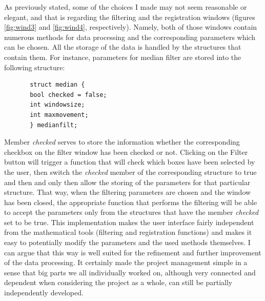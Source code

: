 \documentclass[aps,letterpaper,11pt]{revtex4}
\begin{document}
As previously stated, some of the choices I made may not seem reasonable or elegant, and that is regarding the filtering and the registration windows (figures \ref{fig:wind3} and \ref {fig:wind4}, respectively). Namely, both of those windows contain numerous methods for data processing and the corresponding parameters which can be chosen. All the storage of the data is handled by the structures that contain them. For instance, parameters for median filter  are stored into the following structure:\par
\begin{lstlisting}
       struct median {
       bool checked = false;
       int windowsize;
       int maxmovement;
   	   } medianfilt;
\end{lstlisting}\par
Member \textit{checked} serves to store the information whether the corresponding checkbox on the filter window has been checked or not. Clicking on the Filter button will trigger a function that will check which boxes have been selected by the user, then switch the \textit{checked} member of the corresponding structure to true and then and only then allow the storing of the parameters for that particular structure. That way, when the filtering parameters are chosen and the window has been closed, the appropriate function that performs the filtering will be able to accept the parameters only from the structures that have the member \textit{checked} set to be true. This implementation makes the user interface fairly independent from the mathematical tools (filtering and registration functions) and makes it easy to potentially modify the parameters and the used methods themselves. I can argue that this way is well suited for the refinement and further improvement of the data processing. It certainly made the project management simple in a sense that big parts we all individually worked on, although very connected and dependent when considering the project as a whole, can still be partially independently developed.\par
\end{document}
